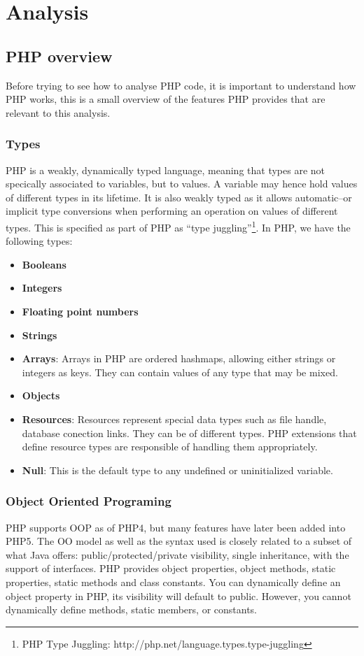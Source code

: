 \documentclass[a4paper]{article}
\begin{document}
\section{Analysis}
\subsection{PHP overview}
Before trying to see how to analyse PHP code, it is important to understand how PHP works,
this is a small overview of the features PHP provides that are relevant to this analysis.
\subsubsection{Types}
PHP is a weakly, dynamically typed language, meaning that types are not specically associated to
variables, but to values. A variable may hence hold values of different types
in its lifetime. It is also weakly typed as it allows automatic--or implicit
type conversions when performing an operation on values of different types.
This is specified as part of PHP as ``type juggling''\footnote{PHP Type
Juggling: http://php.net/language.types.type-juggling}.  In PHP, we have the following
types:
\begin{itemize}
  \item \textbf{Booleans}
  \item \textbf{Integers}
  \item \textbf{Floating point numbers}
  \item \textbf{Strings}
  \item \textbf{Arrays}: Arrays in PHP are ordered hashmaps, allowing either strings or
    integers as keys.  They can contain values of any type that may be mixed.
  \item \textbf{Objects}
  \item \textbf{Resources}: Resources represent special data types such as
    file handle, database conection links. They can be of different types. PHP
    extensions that define resource types are responsible of handling them
    appropriately.
  \item \textbf{Null}: This is the default type to any undefined or
    uninitialized variable.
\end{itemize}

\subsubsection{Object Oriented Programing}
PHP supports OOP as of PHP4, but many features have later been added into PHP5.
The OO model as well as the syntax used is closely related to a subset of what
Java offers: public/protected/private visibility, single inheritance, with the
support of interfaces. PHP provides object properties, object methods, static
properties, static methods and class constants. You can dynamically define an
object property in PHP, its visibility will default to public. However, you
cannot dynamically define methods, static members, or constants.
\end{document}
